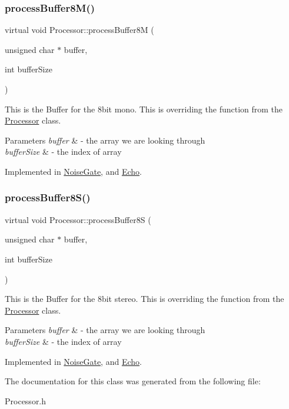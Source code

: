 \subsubsection{\texorpdfstring{process\+Buffer8\+M()}{processBuffer8M()}}
{\footnotesize\ttfamily virtual void Processor\+::process\+Buffer8M (\begin{DoxyParamCaption}\item[{unsigned char $\ast$}]{buffer,  }\item[{int}]{buffer\+Size }\end{DoxyParamCaption})\hspace{0.3cm}{\ttfamily [pure virtual]}}

This is the Buffer for the 8bit mono. This is overriding the function from the \hyperlink{classProcessor}{Processor} class. 
\begin{DoxyParams}{Parameters}
{\em buffer} & -\/ the array we are looking through \\
\hline
{\em buffer\+Size} & -\/ the index of array \\
\hline
\end{DoxyParams}


Implemented in \hyperlink{classNoiseGate_a01d2a4ba032b2b853f19d5f02c998c53}{Noise\+Gate}, and \hyperlink{classEcho_abf2b0cabd5f8bc31aaf564b87cef659f}{Echo}.

\mbox{\label{classProcessor_aa1342ae07ebced7b3232d2badf06dd3a}} 
\subsubsection{\texorpdfstring{process\+Buffer8\+S()}{processBuffer8S()}}
{\footnotesize\ttfamily virtual void Processor\+::process\+Buffer8S (\begin{DoxyParamCaption}\item[{unsigned char $\ast$}]{buffer,  }\item[{int}]{buffer\+Size }\end{DoxyParamCaption})\hspace{0.3cm}{\ttfamily [pure virtual]}}

This is the Buffer for the 8bit stereo. This is overriding the function from the \hyperlink{classProcessor}{Processor} class. 
\begin{DoxyParams}{Parameters}
{\em buffer} & -\/ the array we are looking through \\
\hline
{\em buffer\+Size} & -\/ the index of array \\
\hline
\end{DoxyParams}


Implemented in \hyperlink{classNoiseGate_a95221bfd9afb4a23bfb0b63122e62f26}{Noise\+Gate}, and \hyperlink{classEcho_a97f50641b94e55c8dee0c9c22edf11f1}{Echo}.



The documentation for this class was generated from the following file\+:\begin{DoxyCompactItemize}
\item 
Processor.\+h\end{DoxyCompactItemize}
